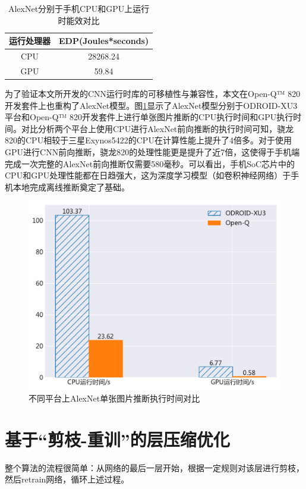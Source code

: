 \begin{table}[htbp]
  \centering
  \caption{AlexNet分别于手机CPU和GPU上运行时能效对比}
  \label{table:table8}
  \begin{tabular}{cc}
    \toprule
      运行处理器 & EDP(Joules*seconds) \\
    \midrule
      CPU & 28268.24 \\
      GPU & 59.84 \\
    \bottomrule
  \end{tabular}
\end{table}

为了验证本文所开发的CNN运行时库的可移植性与兼容性，本文在Open-Q™ 820开发套件上也重构了AlexNet模型。图\ref{figure:figure19}显示了AlexNet模型分别于ODROID-XU3平台和Open-Q™ 820开发套件上进行单张图片推断的CPU执行时间和GPU执行时间。对比分析两个平台上使用CPU进行AlexNet前向推断的执行时间可知，骁龙820的CPU相较于三星Exynos5422的CPU在计算性能上提升了4倍多。对于使用GPU进行CNN前向推断，骁龙820的处理性能更是提升了近7倍，这使得于手机端完成一次完整的AlexNet前向推断仅需要580毫秒。可以看出，手机SoC芯片中的CPU和GPU处理性能都在日趋强大，这为深度学习模型（如卷积神经网络）于手机本地完成离线推断奠定了基础。

\begin{figure}[htbp]
    \centering
    \includegraphics[height=0.4\textwidth]{figures/open_q.pdf}
    \caption{不同平台上AlexNet单张图片推断执行时间对比}\label{figure:figure19}
\end{figure}

\section{基于“剪枝-重训”的层压缩优化}

整个算法的流程很简单：从网络的最后一层开始，根据一定规则对该层进行剪枝，然后retrain网络，循环上述过程。










